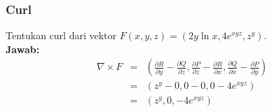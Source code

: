 \documentclass[10pt]{beamer}
\begin{document}
\begin{frame}
    \frametitle{Curl}
    \begin{example}
        Tentukan curl dari vektor $F(x,y,z) = (2y \ln x,4e^{xyz}, z^y )$.\\
        \textbf{Jawab:}
        \begin{eqnarray*}
            \nabla \times F &=& \left(\frac{\partial R}{\partial y} - \frac{\partial Q}{\partial z}, \frac{\partial P}{\partial z} - \frac{\partial R}{\partial x}, \frac{\partial Q}{\partial x} - \frac{\partial P}{\partial y}\right)\\
            &=& (z^y - 0, 0 - 0, 0 - 4e^{xyz})\\
            &=& (z^y, 0, -4e^{xyz})
        \end{eqnarray*}
    \end{example}
\end{frame}
\end{document}
